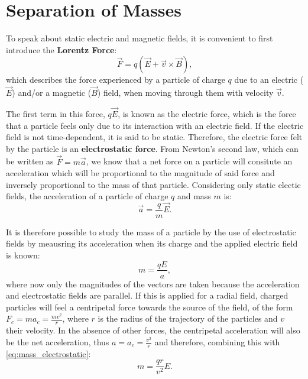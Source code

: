 \section{Separation of Masses}

To speak about static electric and magnetic fields, it is convenient to first introduce the \textbf{Lorentz Force}:
\begin{equation}
    \label{eq:lorentz}
    \vec F = q\left( \vec E + \vec v \times \vec B\right),
\end{equation} which describes the force experienced by a particle of charge $q$ due to an electric ($\vec E$) and/or a magnetic ($\vec B$) field, when moving through them with velocity $\vec v$.

The first term in this force, $q\vec E$, is known as the electric force, which is the force that a particle feels only due to its interaction with an electric field. If the electric field is not time-dependent, it is said to be static. Therefore, the electric force felt by the particle is an \textbf{electrostatic force}. From Newton's second law, which can be written as $\vec F = m\vec a$, we know that a net force on a particle will consitute an acceleration which will be proportional to the magnitude of said force and inversely proportional to the mass of that particle. Considering only static electic fields, the acceleration of a particle of charge $q$ and mass $m$ is:
\begin{equation}
    \label{eq:electrostatic}
    \vec a = \frac{q}{m}\vec E.
\end{equation}

It is therefore possible to study the mass of a particle by the use of electrostatic fields by meausring its acceleration when its charge and the applied electric field is known: 
\begin{equation}
    \label{eq:mass_electrostatic}
    m = \frac{qE}{a},
\end{equation} where now only the magnitudes of the vectors are taken because the acceleration and electrostatic fields are parallel. If this is applied for a radial field, charged particles will feel a centripetal force towards the source of the field, of the form $F_c = m a_c = \frac{mv^2}{r}$, where $r$ is the radius of the trajectory of the particles and $v$ their velocity. In the absence of other forces, the centripetal acceleration will also be the net acceleration, thus $a = a_c = \frac{v^2}{r}$ and therefore, combining this with \autoref{eq:mass_electrostatic}:
\begin{equation}
    \label{eq:centripetal}
    m = \frac{qr}{v^2}E.
\end{equation} 

